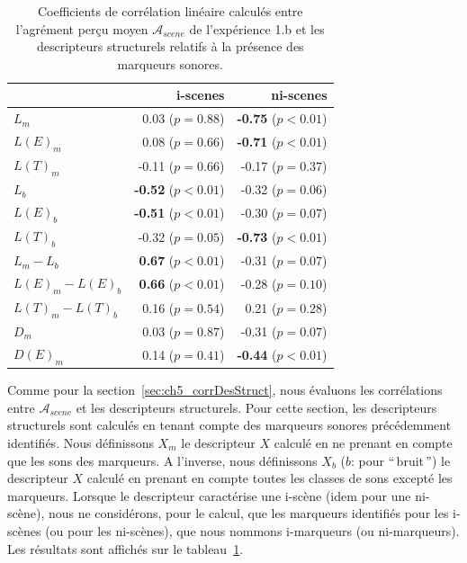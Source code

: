 \begin{table}[t]
\centering
\begin{tabular}{l r r} 
                  &   i-scenes                  & ni-scenes \\
\hline
$L_m$              & 0.03  ($p=0.88$)           & \textbf{-0.75} ($p<0.01$) \\
$L(E)_m$           & 0.08  ($p=0.66$)           & \textbf{-0.71} ($p<0.01$) \\
$L(T)_m$           & -0.11 ($p=0.66$)           & -0.17 ($p=0.37$) \\
$L_b$              & \textbf{-0.52} ($p<0.01$)  & -0.32 ($p=0.06$) \\
$L(E)_b$           & \textbf{-0.51} ($p<0.01$)  & -0.30 ($p=0.07$) \\
$L(T)_b$           & -0.32 ($p=0.05$)           & \textbf{-0.73} ($p<0.01$) \\
$L_m-L_b$          & \textbf{0.67} ($p<0.01$)   & -0.31 ($p=0.07$) \\
$L(E)_m-L(E)_b$    & \textbf{0.66} ($p<0.01$)   & -0.28 ($p=0.10$) \\
$L(T)_m-L(T)_b$    & 0.16 ($p=0.54$)            & 0.21 ($p=0.28$) \\
$D_m$              & 0.03 ($p=0.87$)            & -0.31 ($p=0.07$) \\
$D(E)_m$           & 0.14 ($p=0.41$)            & \textbf{-0.44} ($p<0.01$) \\
\hline
\end{tabular}
\vspace{0.5mm}
\caption{Coefficients de corrélation linéaire calculés entre l'agrément perçu moyen $\mathcal{A}_{scene}$ de l'expérience 1.b et les descripteurs structurels relatifs à la présence des marqueurs sonores.}
\label{tab:corrMarkers}
\end{table}

Comme pour la  section~\ref{sec:ch5_corrDesStruct}, nous évaluons les corrélations entre $\mathcal{A}_{scene}$ et les descripteurs structurels. Pour cette section, les descripteurs structurels sont calculés en tenant compte des marqueurs sonores précédemment identifiés. Nous définissons $X_m$ le descripteur $X$ calculé en ne prenant en compte que les sons des marqueurs. A l'inverse, nous définissons $X_b$ ($b$: pour ``\,bruit\,'') le descripteur $X$ calculé en prenant en compte toutes les classes de sons excepté les marqueurs. Lorsque le descripteur caractérise une i-scène (idem pour une ni-scène), nous ne considérons, pour le calcul, que les marqueurs identifiés pour les i-scènes (ou pour les ni-scènes), que nous nommons i-marqueurs (ou ni-marqueurs). Les résultats sont affichés sur le tableau~\ref{tab:corrMarkers}.

